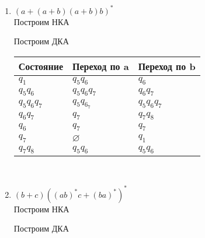 \documentclass{article}
\begin{document}
\begin{enumerate}
            \begin{center}
            \end{center}
        
        
        \newpage
        \item $(a+(a+b)(a+b)b)^*$ \\
            Построим НКА
            \begin{center}
            \end{center}
            
            Построим ДКА
            
            \begin{tabular} { | l | l | l | }
                \hline 
                Состояние & Переход по a & Переход по b \\ \hline
                $q_1$ & $q_5q_6$ & $q_6$ \\ \hline
                $q_5q_6$ & $q_5q_6q_7$ & $q_6q_7$ \\ \hline
                $q_5q_6q_7$ & $q_5q_6_7$ & $q_5q_6q_7$ \\ \hline
                $q_6q_7$ & $q_7$ & $q_7q_8$ \\ \hline
                $q_6$ & $q_7$ & $q_7$ \\ \hline
                $q_7$ & $\varnothing$ & $q_1$ \\ \hline
                $q_7q_8$ & $q_5q_6$ & $q_5q_6$ \\
                \hline
            \end{tabular} \\
            
            \begin{center}
            \end{center}
        
        
        \item $(b+c)((ab)^*c+(ba)^*)^*$ \\
            Построим НКА
            \begin{center}
            \end{center} 
            
            \newpage Построим ДКА
            

\end{enumerate}
\end{document}

